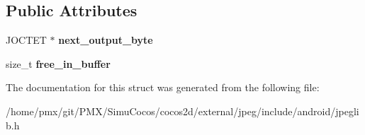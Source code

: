 \subsection*{Public Attributes}
\begin{DoxyCompactItemize}
\item 
\mbox{\label{structjpeg__destination__mgr_a7fac15f83b05d50d5a35461620e9c34a}} 
J\+O\+C\+T\+ET $\ast$ {\bfseries next\+\_\+output\+\_\+byte}
\item 
\mbox{\label{structjpeg__destination__mgr_a397cc63a089447fe96e35062c4979906}} 
size\+\_\+t {\bfseries free\+\_\+in\+\_\+buffer}
\end{DoxyCompactItemize}


The documentation for this struct was generated from the following file\+:\begin{DoxyCompactItemize}
\item 
/home/pmx/git/\+P\+M\+X/\+Simu\+Cocos/cocos2d/external/jpeg/include/android/jpeglib.\+h\end{DoxyCompactItemize}
